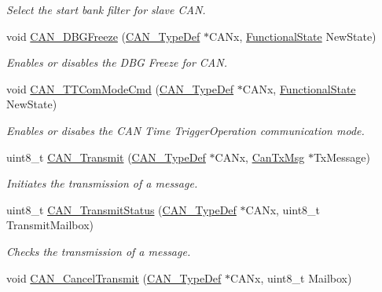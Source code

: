 \begin{DoxyCompactItemize}
\begin{DoxyCompactList}\small\item\em Select the start bank filter for slave C\+AN. \end{DoxyCompactList}\item 
void \hyperlink{group___c_a_n___private___functions_gac0e2d33e08caf49d1f1251f0dcc20213}{C\+A\+N\+\_\+\+D\+B\+G\+Freeze} (\hyperlink{struct_c_a_n___type_def}{C\+A\+N\+\_\+\+Type\+Def} $\ast$C\+A\+Nx, \hyperlink{group___exported__types_gac9a7e9a35d2513ec15c3b537aaa4fba1}{Functional\+State} New\+State)
\begin{DoxyCompactList}\small\item\em Enables or disables the D\+BG Freeze for C\+AN. \end{DoxyCompactList}\item 
void \hyperlink{group___c_a_n___private___functions_ga94740177bab153ca5b102d122f9a8cca}{C\+A\+N\+\_\+\+T\+T\+Com\+Mode\+Cmd} (\hyperlink{struct_c_a_n___type_def}{C\+A\+N\+\_\+\+Type\+Def} $\ast$C\+A\+Nx, \hyperlink{group___exported__types_gac9a7e9a35d2513ec15c3b537aaa4fba1}{Functional\+State} New\+State)
\begin{DoxyCompactList}\small\item\em Enables or disabes the C\+AN Time Trigger\+Operation communication mode. \end{DoxyCompactList}\item 
uint8\+\_\+t \hyperlink{group___c_a_n___private___functions_gaccfcb81f76f58400077c7b2d8641dd83}{C\+A\+N\+\_\+\+Transmit} (\hyperlink{struct_c_a_n___type_def}{C\+A\+N\+\_\+\+Type\+Def} $\ast$C\+A\+Nx, \hyperlink{struct_can_tx_msg}{Can\+Tx\+Msg} $\ast$Tx\+Message)
\begin{DoxyCompactList}\small\item\em Initiates the transmission of a message. \end{DoxyCompactList}\item 
uint8\+\_\+t \hyperlink{group___c_a_n___private___functions_ga68ab05a0a6cdfcc2b6f6b6b2c10848e2}{C\+A\+N\+\_\+\+Transmit\+Status} (\hyperlink{struct_c_a_n___type_def}{C\+A\+N\+\_\+\+Type\+Def} $\ast$C\+A\+Nx, uint8\+\_\+t Transmit\+Mailbox)
\begin{DoxyCompactList}\small\item\em Checks the transmission of a message. \end{DoxyCompactList}\item 
void \hyperlink{group___c_a_n___private___functions_ga81106cdf5395a1947bfc87ec1685829e}{C\+A\+N\+\_\+\+Cancel\+Transmit} (\hyperlink{struct_c_a_n___type_def}{C\+A\+N\+\_\+\+Type\+Def} $\ast$C\+A\+Nx, uint8\+\_\+t Mailbox)

\end{DoxyCompactItemize}
